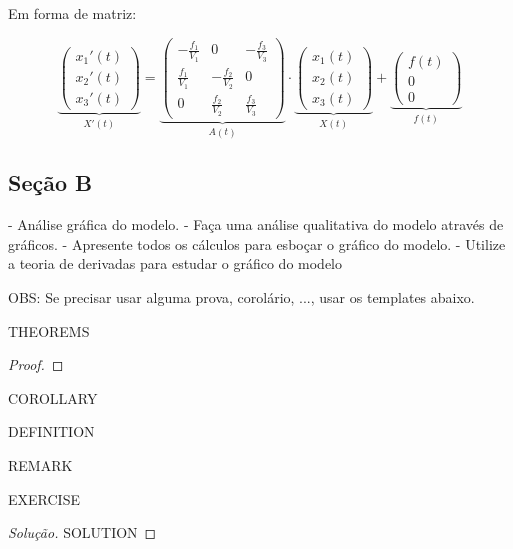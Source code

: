 Em forma de matriz:
\begin{center}
\begin{equation}
\renewcommand{\arraystretch}{1.8}
\underbrace{\begin{pmatrix}
    x_1'(t)\\
    x_2'(t)\\
    x_3'(t)
\end{pmatrix}}_\text{$X'(t)$}
=
\underbrace{\begin{pmatrix}
-\frac{f_1}{V_1} & 0 & -\frac{f_3}{V_3}\\
\frac{f_1}{V_1} & -\frac{f_2}{V_2} & 0\\
0 & \frac{f_2}{V_2} & \frac{f_3}{V_3}
\end{pmatrix}}_\text{$A(t)$}
\cdot
\underbrace{\begin{pmatrix}
x_1(t)\\
x_2(t)\\
x_3(t)
\end{pmatrix}}_\text{$X(t)$}
+
\underbrace{\begin{pmatrix}
f(t)\\
0\\
0
\end{pmatrix}}_\text{$f(t)$}
\end{equation}
\end{center}



\subsection{Seção B}

- Análise gráfica do modelo.
- Faça uma análise qualitativa do modelo através de gráficos. 
- Apresente todos os cálculos para esboçar o gráfico do modelo. 
- Utilize a teoria de derivadas para estudar o gráfico do modelo


OBS: Se precisar usar alguma prova, corolário, ..., usar os templates abaixo.

\begin{theorem}
THEOREMS
\end{theorem}
\begin{proof}
\end{proof}
\begin{corollary}
COROLLARY
\end{corollary}
\begin{definition}
DEFINITION
\end{definition}
\begin{remark}
REMARK
\end{remark}
\begin{exercise}
EXERCISE
\end{exercise}
\begin{proof}[Solução]
SOLUTION
\end{proof}
\clearpage